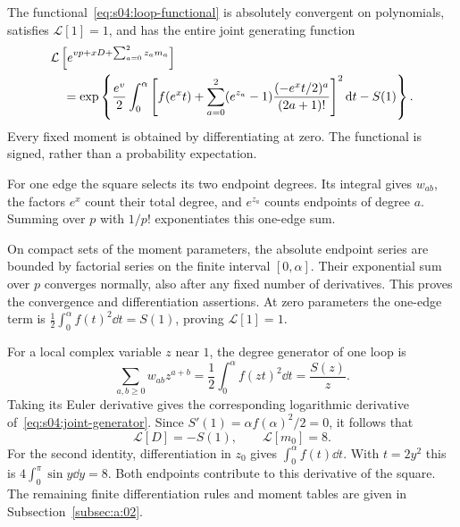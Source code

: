 \begin{lmm}\label{lmm:s04:loop-moments}
The functional~\eqref{eq:s04:loop-functional} is absolutely convergent
on polynomials, satisfies $\mathcal L[1]=1$, and has the entire
joint generating function
\begin{align}
 &\mathcal L\left[e^{vp+xD+\sum_{a=0}^2z_a m_a}\right]\notag\\
 &\quad=\exp\left\{\frac{e^v}{2}\int_0^\alpha
 \left[f(e^x t)+\sum_{a=0}^2(e^{z_a}-1)
               \frac{(-e^x t/2)^a}{(2a+1)!}\right]^2\mathrm{d} t-S(1)\right\}.
 \label{eq:s04:joint-generator}
\end{align}
Every fixed moment is obtained by differentiating at zero. The
functional is signed, rather than a probability expectation.
\end{lmm}
\begin{prf}
For one edge the square selects its two endpoint degrees. Its
integral gives $w_{ab}$, the factors $e^x$ count their total degree,
and $e^{z_a}$ counts endpoints of degree $a$. Summing over $p$ with
$1/p!$ exponentiates this one-edge sum.

On compact sets of the moment parameters, the absolute endpoint
series are bounded by factorial series on the finite interval
$[0,\alpha]$. Their exponential sum over $p$ converges normally,
also after any fixed number of derivatives. This proves the
convergence and differentiation assertions. At zero parameters the
one-edge term is $\tfrac12\int_0^\alpha f(t)^2\dd t=S(1)$, proving
$\mathcal L[1]=1$.
\end{prf}

\begin{exm}
For a local complex variable $z$ near $1$, the degree generator of
one loop is
\[
 \sum_{a,b\geq0}w_{ab}z^{a+b}
 =\frac12\int_0^\alpha f(zt)^2\dd t=\frac{S(z)}z.
\]
Taking its Euler derivative gives the corresponding logarithmic
derivative of~\eqref{eq:s04:joint-generator}. Since
$S'(1)=\alpha f(\alpha)^2/2=0$, it follows that
\begin{equation}\label{eq:s04:representative-moments}
 \mathcal L[D]=-S(1),\qquad \mathcal L[m_0]=8.
\end{equation}
For the second identity, differentiation in $z_0$ gives
$\int_0^\alpha f(t)\dd t$. With $t=2y^2$ this is
$4\int_0^\pi\sin y\dd y=8$. Both endpoints contribute to this
derivative of the square. The remaining finite differentiation rules
and moment tables are given in Subsection~\ref{subsec:a:02}.
\end{exm}
